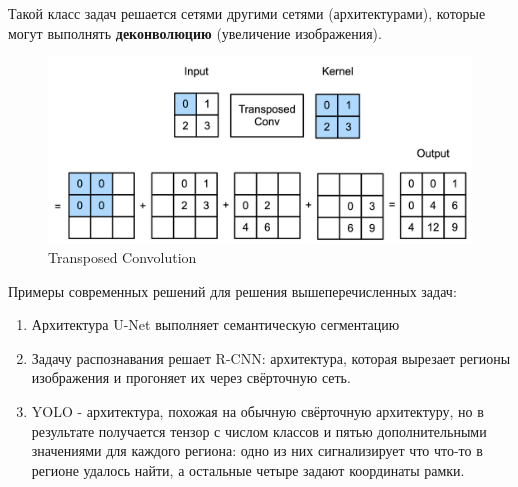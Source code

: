 \begin{remark}
    Такой класс задач решается сетями другими сетями (архитектурами), которые могут выполнять \textbf{деконволюцию} (увеличение изображения).
\end{remark}

\begin{figure}[htb]
    \centering
    \includegraphics[scale=0.4]{./images/transposed-convolution.png}
    \caption{Transposed Convolution}
\end{figure}

Примеры современных решений для решения вышеперечисленных задач:
\begin{enumerate}
    \item Архитектура U-Net выполняет семантическую сегментацию
    \item Задачу распознавания решает R-CNN: архитектура, которая вырезает регионы изображения и прогоняет их через свёрточную сеть.
    \item YOLO - архитектура, похожая на обычную свёрточную архитектуру, но в результате получается тензор с числом классов и пятью дополнительными значениями для каждого региона: одно из них сигнализирует что что-то в регионе удалось найти, а остальные четыре задают координаты рамки.
\end{enumerate}
